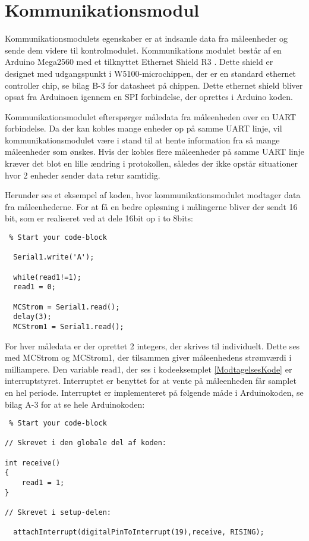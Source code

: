 
\section{Kommunikationsmodul}
\label{sec:Kommunikationsmodul}
Kommunikationsmodulets egenskaber er at indsamle data fra måleenheder og sende dem videre til kontrolmodulet. Kommunikations modulet består af en Arduino Mega2560 med et tilknyttet Ethernet Shield R3 \cite{Shield}. Dette shield er designet med udgangspunkt i W5100-microchippen, der er en standard ethernet controller chip, se bilag B-3 for datasheet på chippen. Dette ethernet shield bliver opsat fra Arduinoen igennem en SPI forbindelse, der oprettes i Arduino koden. 

Kommunikationsmodulet efterspørger måledata fra måleenheden over en UART forbindelse. Da der kan kobles mange enheder op på samme UART linje, vil kommunikationsmodulet være i stand til at hente information fra så mange måleenheder som ønskes. Hvis der kobles flere måleenheder på samme UART linje kræver det blot en lille ændring i protokollen, således der ikke opstår situationer hvor 2 enheder sender data retur samtidig. 


Herunder ses et eksempel af koden, hvor kommunikationsmodulet modtager data fra måleenhederne. For at få en bedre opløsning i målingerne bliver der sendt 16 bit, som er realiseret ved at dele 16bit op i to 8bits: 

\begin{lstlisting} % Start your code-block
  
  Serial1.write('A');
  
  while(read1!=1);
  read1 = 0;
  
  MCStrom = Serial1.read();
  delay(3);
  MCStrom1 = Serial1.read();
\end{lstlisting}


For hver måledata er der oprettet 2 integers, der skrives til individuelt. Dette ses med MCStrom og MCStrom1, der tilsammen giver måleenhedens strømværdi i milliampere. 
Den variable read1, der ses i kodeeksemplet \ref{ModtagelsesKode} er interruptstyret. Interruptet er benyttet for at vente på måleenheden får samplet en hel periode. Interruptet er implementeret på følgende måde i Arduinokoden, se bilag A-3 for at se hele Arduinokoden: 

\begin{lstlisting} % Start your code-block

// Skrevet i den globale del af koden:

int receive()
{
	read1 = 1;
}

// Skrevet i setup-delen:

  attachInterrupt(digitalPinToInterrupt(19),receive, RISING);

\end{lstlisting}


